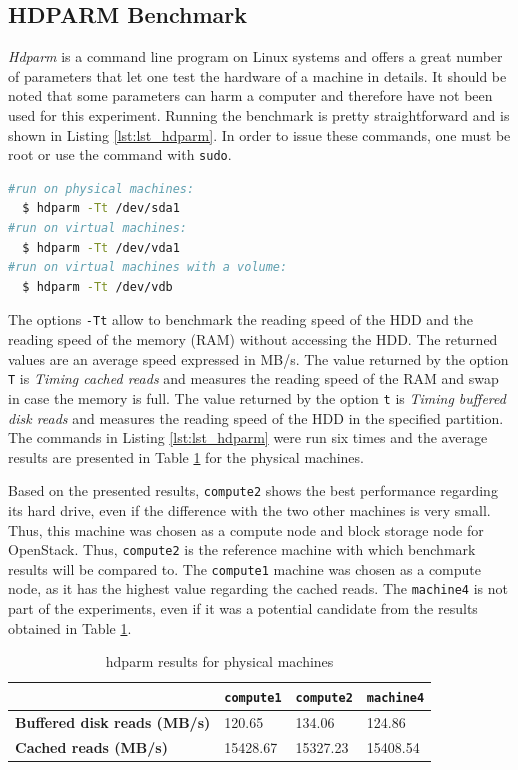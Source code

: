 \subsection{HDPARM Benchmark}
\textit{Hdparm} is a command line program on Linux systems and offers a great number of parameters that let one test the hardware of a machine in details. 
It should be noted that some parameters can harm a computer and therefore have not been used for this experiment. 
Running the benchmark is pretty straightforward and is shown in Listing \ref{lst:lst_hdparm}.
In order to issue these commands, one must be root or use the command with \texttt{sudo}.

{
\singlespacing
\begin{lstlisting}[frame=single,language=bash,caption={hdparm commands},label={lst:lst_hdparm}]
#run on physical machines:
  $ hdparm -Tt /dev/sda1
#run on virtual machines:
  $ hdparm -Tt /dev/vda1
#run on virtual machines with a volume:
  $ hdparm -Tt /dev/vdb
\end{lstlisting}
}

The options \texttt{-Tt} allow to benchmark the reading speed of the HDD and the reading speed of the memory (RAM) without accessing the HDD. 
The returned values are an average speed expressed in MB/s. 
The value returned by the option \texttt{T} is \textit{Timing cached reads} and measures the reading speed of the RAM and swap in case the memory is full. 
The value returned by the option \texttt{t} is \textit{Timing buffered disk reads} and measures the reading speed of the HDD in the specified partition.
The commands in Listing \ref{lst:lst_hdparm} were run six times and the average results are presented in Table \ref{table:hdparm_res_PM} for the physical machines. 

Based on the presented results, \texttt{compute2} shows the best performance regarding its hard drive, even if the difference with the two other machines is very small. 
Thus, this machine was chosen as a compute node and block storage node for OpenStack.
Thus, \texttt{compute2} is the reference machine with which benchmark results will be compared to.
The \texttt{compute1} machine was chosen as a compute node, as it has the highest value regarding the cached reads.
The \texttt{machine4} is not part of the experiments, even if it was a potential candidate from the results obtained in Table \ref{table:hdparm_res_PM}.

\begin{table}[h]
	\centering
	\begin{tabular}{|m{6cm}|m{2.5cm}|m{2.5cm}|m{2.5cm}|}
		\hline
		& 
		\texttt{compute1} & %
		\texttt{compute2} & %
		\texttt{machine4} \\
		\hline
		\textbf{Buffered disk reads (MB/s)} & 
		120.65 & 
		134.06 & 
		124.86 \\
		\hline
		\textbf{Cached reads (MB/s)} &  
		15428.67 & 
		15327.23 & 
		15408.54 \\
		\hline
	\end{tabular}
	\caption{hdparm results for physical machines}
	\label{table:hdparm_res_PM}
\end{table}

